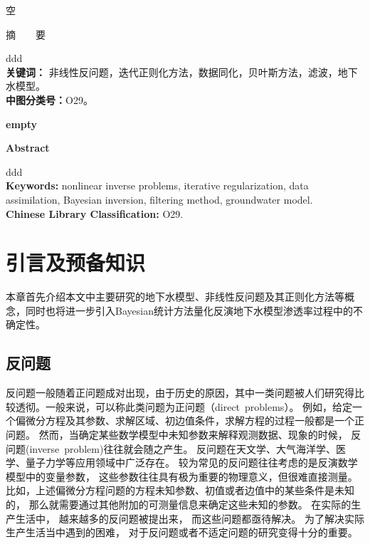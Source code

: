\documentclass[a4paper,12pt,oneside,CJK]{cctbook}
\theoremstyle{definition}
\numberwithin{equation}{section}
\begin{document}
\newpage
\pagestyle{plain}
\frontmatter
\tableofcontents


\newpage
\pagestyle{plain}
\mainmatter


\centerline{空}
\vspace{6mm}

\centerline{\heiti 摘\ \ \ \ 要}
\vspace{2mm}

ddd
\\
{\bf 关键词：} 非线性反问题，迭代正则化方法，数据同化，贝叶斯方法，滤波，地下水模型。\\
{\bf 中图分类号：}\quad O29。


\newpage


\centerline{\large\bf empty}
\vspace{6mm}

\centerline{\bf\large Abstract}
\vspace{2mm}

ddd
\\
{\bf Keywords: }  nonlinear inverse problems, iterative regularization, data assimilation,  Bayesian inversion, filtering method, groundwater model.\\
{\bf Chinese Library Classification: }\quad O29.


\newpage
\pagestyle{main}



\chapter{引言及预备知识}\label{chp:intro}
本章首先介绍本文中主要研究的地下水模型、非线性反问题及其正则化方法等概念，同时也将进一步引入Bayesian统计方法量化反演地下水模型渗透率过程中的不确定性。

\section{反问题}
反问题一般随着正问题成对出现，由于历史的原因，其中一类问题被人们研究得比较透彻。一般来说，可以称此类问题为正问题（direct~problems）。
例如，给定一个偏微分方程及其参数、求解区域、初边值条件，求解方程的过程一般都是一个正问题。
然而，当确定某些数学模型中未知参数来解释观测数据、现象的时候，
反问题(inverse~problem)往往就会随之产生。
反问题在天文学、大气海洋学、医学、量子力学等应用领域中广泛存在。
较为常见的反问题往往考虑的是反演数学模型中的变量参数，
这些参数往往具有极为重要的物理意义，但很难直接测量。
比如，上述偏微分方程问题的方程未知参数、初值或者边值中的某些条件是未知的，
那么就需要通过其他附加的可测量信息来确定这些未知的参数。
在实际的生产生活中，
越来越多的反问题被提出来，
而这些问题都亟待解决。
为了解决实际生产生活当中遇到的困难，
对于反问题或者不适定问题的研究变得十分的重要。
\end{document}
